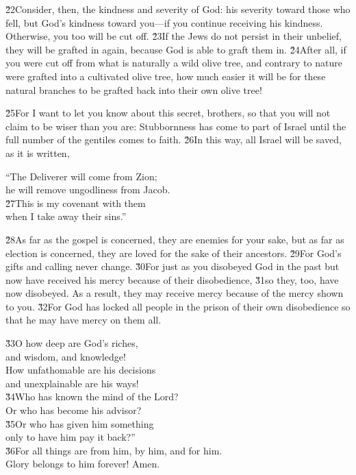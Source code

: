 \v{22}Consider, then, the kindness and severity of God: his severity toward those who fell, but God's kindness toward you---if you continue receiving his kindness. Otherwise, you too will be cut off. \v{23}If the Jews do not persist in their unbelief, they will be grafted in again, because God is able to graft them in. \v{24}After all, if you were cut off from what is naturally a wild olive tree, and contrary to nature were grafted into a cultivated olive tree, how much easier it will be for these natural branches to be grafted back into their own olive tree!

\v{25}For I want to let you know about this secret, brothers, so that you will not claim to be wiser than you are: Stubbornness has come to part of Israel until the full number of the gentiles comes to faith. \v{26}In this way, all Israel will be saved, as it is written,

\begin{poetry}
\poeml ``The Deliverer will come from Zion; \\
\poemll    he will remove ungodliness from Jacob. \\
\poeml \v{27}This is my covenant with them \\
\poemll    when I take away their sins.''
\end{poetry}

\v{28}As far as the gospel is concerned, they are enemies for your sake, but as far as election is concerned, they are loved for the sake of their ancestors. \v{29}For God's gifts and calling never change. \v{30}For just as you disobeyed God in the past but now have received his mercy because of their disobedience, \v{31}so they, too, have now disobeyed. As a result, they may receive mercy because of the mercy shown to you. \v{32}For God has locked all people in the prison of their own disobedience so that he may have mercy on them all.

\begin{poetry}
\poeml \v{33}O how deep are God's riches, \\
\poemll    and wisdom, and knowledge! \\
\poeml How unfathomable are his decisions \\
\poemll    and unexplainable are his ways! \\
\poeml \v{34}Who has known the mind of the Lord? \\
\poemll    Or who has become his advisor? \\
\poeml \v{35}Or who has given him something \\
\poemll    only to have him pay it back?'' \\
\poeml \v{36}For all things are from him, by him, and for him. \\
\poemll    Glory belongs to him forever! Amen.
\end{poetry}

